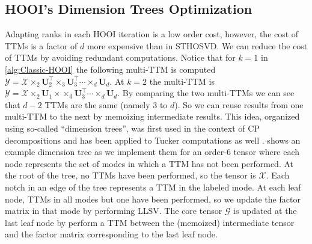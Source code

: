 

\subsection{HOOI's Dimension Trees Optimization}
    Adapting ranks in each HOOI iteration is a low order cost, however, the cost
    of TTMs is a factor of $d$ more expensive than in STHOSVD. We can reduce the
    cost of TTMs by avoiding redundant computations. Notice that for $k = 1$ in
    \cref{alg:Classic-HOOI} the following multi-TTM is computed $\mathcal{Y} =
    \mathcal{X} \times_2 \mathbf{U}_{2}^\intercal \times_3
    \mathbf{U}_{3}^\intercal \cdots \times_d \mathbf{U}_{d}$. At $k = 2$ the
    multi-TTM is $\mathcal{Y} = \mathcal{X} \times_2 \mathbf{U}_{1}\times
    \times_3 \mathbf{U}_{3}^\intercal \cdots \times_d \mathbf{U}_{d}$. By
    comparing the two multi-TTMs we can see that $d - 2$ TTMs are the same
    (namely 3 to $d$). So we can reuse results from one multi-TTM to the next by
    memoizing intermediate results. This idea, organized using so-called
    ``dimension trees'', was first used in the context of CP decompositions
    \cite{PTC13a} and has been applied to Tucker computations as well
    \cite{kaya2019computing,MLB24}.  shows an example
    dimension tree as we implement them for an order-$6$ tensor where each node
    represents the set of modes in which a TTM has not been performed. At the
    root of the tree, no TTMs have been performed, so the tensor is $\mathcal{X}$.
    Each notch in an edge of the tree represents a TTM in the labeled mode. At
    each leaf node, TTMs in all modes but one have been performed, so we update
    the factor matrix in that mode by performing LLSV. The core tensor $\mathcal{G}$
    is updated at the last leaf node by perform a TTM between the (memoized)
    intermediate tensor and the factor matrix corresponding to the last leaf
    node.


